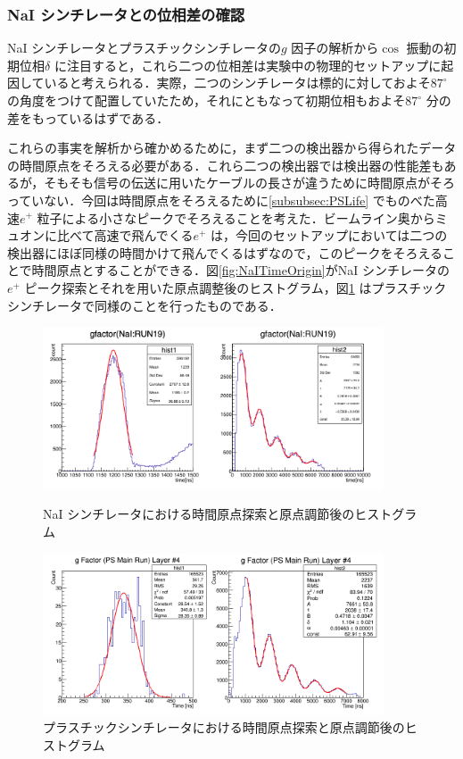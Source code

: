 \subsubsection{NaI シンチレータとの位相差の確認}
\label{subsubsec:PhaseCheck}
NaI シンチレータとプラスチックシンチレータの$g$ 因子の解析から$\cos$ 振動の初期位相$\delta$ に注目すると，これら二つの位相差は実験中の物理的セットアップに起因していると考えられる．実際，二つのシンチレータは標的に対しておよそ$87^{\circ}$ の角度をつけて配置していたため，それにともなって初期位相もおよそ$87^{\circ}$ 分の差をもっているはずである．

これらの事実を解析から確かめるために，まず二つの検出器から得られたデータの時間原点をそろえる必要がある．これら二つの検出器では検出器の性能差もあるが，そもそも信号の伝送に用いたケーブルの長さが違うために時間原点がそろっていない．今回は時間原点をそろえるために\ref{subsubsec:PSLife} でものべた高速$e^{+}$ 粒子による小さなピークでそろえることを考えた．ビームライン奥からミュオンに比べて高速で飛んでくる$e^{+}$ は，今回のセットアップにおいては二つの検出器にほぼ同様の時間かけて飛んでくるはずなので，このピークをそろえることで時間原点とすることができる．図\ref{fig:NaITimeOrigin}がNaI シンチレータの$e^{+}$ ピーク探索とそれを用いた原点調整後のヒストグラム，図\ref{fig:PSTimeOrigin} はプラスチックシンチレータで同様のことを行ったものである．

\begin{figure}[h]
	\centering
	\includegraphics[width = 0.9\textwidth]{figure/odagawa/NaITimeOrigin.png}
	\caption{NaI シンチレータにおける時間原点探索と原点調節後のヒストグラム}
	\label{fig:NaITimeOrigin}
	\includegraphics[width = 0.9\textwidth]{figure/odagawa/PSTimeOrigin.png}
	\caption{プラスチックシンチレータにおける時間原点探索と原点調節後のヒストグラム}
	\label{fig:PSTimeOrigin}
\end{figure}

